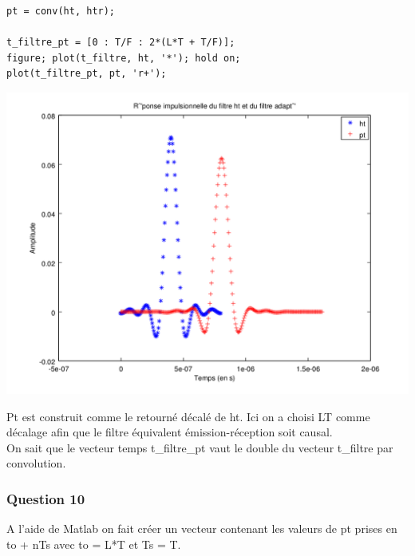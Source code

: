 \documentclass{acm_proc_article-sp}
\begin{document}
\begin{center}
\begin{lstlisting}
pt = conv(ht, htr);

t_filtre_pt = [0 : T/F : 2*(L*T + T/F)];
figure; plot(t_filtre, ht, '*'); hold on;
plot(t_filtre_pt, pt, 'r+');
\end{lstlisting}

\includegraphics[scale=0.45]{ht_pt_9.png}
\end{center}

Pt est construit comme le retourné décalé de ht. Ici on a choisi LT comme décalage afin que le filtre équivalent émission-réception soit causal.\\
On sait que le vecteur temps t\_filtre\_pt vaut le double du vecteur t\_filtre par convolution.

\subsubsection{Question 10}

A l'aide de Matlab on fait créer un vecteur contenant les valeurs de pt prises en to + nTs avec to = L*T et Ts = T.
\end{document}
